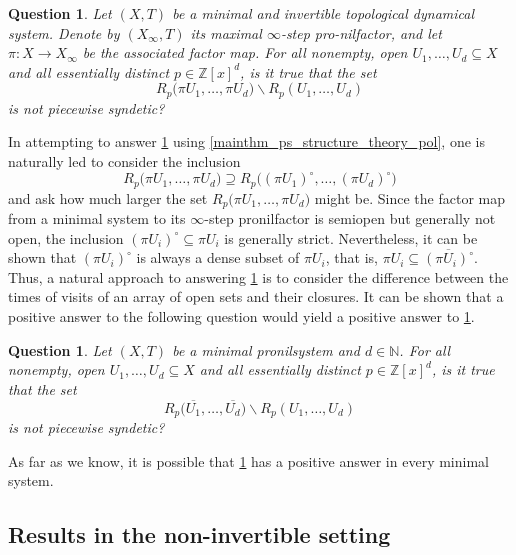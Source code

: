 \documentclass{article}
\theoremstyle{plain}
\newtheorem{question}[Theorem]{Question}
\theoremstyle{claim}
\theoremstyle{definition}
\theoremstyle{plain}
\theoremstyle{plain}
\newcommand{\N}{\mathbb{N}}
\newcommand{\Z}{\mathbb{Z}}
\renewcommand{\setminus}{\backslash}
\newcommand{\1}{\boldsymbol{1}}
\begin{document}
\begin{question}
\label{quest_remove_interiors}
    Let $(X,T)$ be a minimal and invertible topological dynamical system. Denote by $(X_\infty,T)$ its maximal $\infty$-step pro-nilfactor, and let $\pi\colon X\to X_\infty$ be the associated factor map.
    For all nonempty, open $U_1, \ldots, U_d \subseteq X$ and all essentially distinct $p \in \mathbb{Z}[x]^d$, is it true that the set
    \[
        R_p\big(\pi U_1, \ldots, \pi U_d\big) \setminus R_p(U_1, \ldots, U_d)
    \]
    is not piecewise syndetic?
\end{question}

In attempting to answer \cref{quest_remove_interiors} using \cref{mainthm_ps_structure_theory_pol}, one is naturally led to consider the inclusion
\[R_p\big(\pi U_1, \ldots, \pi U_d\big) \supseteq R_p\big((\pi U_1)^\circ, \ldots, (\pi U_d)^\circ\big)\]
and ask how much larger the set $R_p\big(\pi U_1, \ldots, \pi U_d\big)$ might be.  Since the factor map from a minimal system to its $\infty$-step pronilfactor is semiopen but generally not open, the inclusion $(\pi U_i)^\circ \subseteq \pi U_i$ is generally strict.
Nevertheless, it can be shown that $(\pi U_i)^\circ$ is always a dense subset of $\pi U_i$, that is, $\pi U_i \subseteq \overline{(\pi U_i)^\circ}$. Thus, a natural approach to answering \cref{quest_remove_interiors} is to consider the difference between the times of visits of an array of open sets and their closures.  It can be shown that a positive answer to the following question would yield a positive answer to \cref{quest_remove_interiors}.


\begin{question}
\label{quest_orbits_of_diagonal_along_thick_sets_in_nilsystems_1}
Let $(X,T)$ be a minimal pronilsystem and $d\in\N$.
For all nonempty, open $U_1, \ldots, U_d \subseteq X$ and all essentially distinct $p \in \Z[x]^d$, is it true that the set
\[
R_p\big(\overline{U_1}, \ldots, \overline{U_d}\big) \setminus R_p(U_1, \ldots, U_d  )
\]
is not piecewise syndetic?
\end{question}

 
As far as we know, it is possible that \cref{quest_orbits_of_diagonal_along_thick_sets_in_nilsystems_1} has a positive answer in every minimal system.




\subsection{Results in the non-invertible setting}
\label{sec_non_invert}
\end{document}
